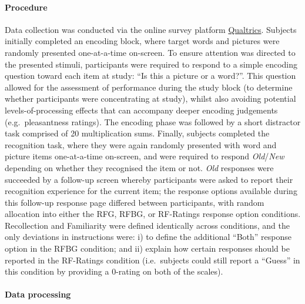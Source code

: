 \documentclass[
  11pt,
]{article}
\begin{document}
\hypertarget{procedure}{%
\paragraph{Procedure}\label{procedure}}

Data collection was conducted via the online survey platform
\href{https://www.qualtrics.com/uk/}{Qualtrics}. Subjects initially
completed an encoding block, where target words and pictures were
randomly presented one-at-a-time on-screen. To ensure attention was
directed to the presented stimuli, participants were required to respond
to a simple encoding question toward each item at study: ``Is this a
picture or a word?''. This question allowed for the assessment of
performance during the study block (to determine whether participants
were concentrating at study), whilst also avoiding potential
levels-of-processing effects that can accompany deeper encoding
judgements (e.g.~pleasantness ratings). The encoding phase was followed
by a short distractor task comprised of 20 multiplication sums. Finally,
subjects completed the recognition task, where they were again randomly
presented with word and picture items one-at-a-time on-screen, and were
required to respond \emph{Old}/\emph{New} depending on whether they
recognised the item or not. \emph{Old} responses were succeeded by a
follow-up screen whereby participants were asked to report their
recognition experience for the current item; the response options
available during this follow-up response page differed between
participants, with random allocation into either the RFG, RFBG, or
RF-Ratings response option conditions. Recollection and Familiarity were
defined identically across conditions, and the only deviations in
instructions were: i) to define the additional ``Both'' response option
in the RFBG condition; and ii) explain how certain responses should be
reported in the RF-Ratings condition (i.e.~subjects could still report a
``Guess'' in this condition by providing a 0-rating on both of the
scales).

\hypertarget{data-processing}{%
\paragraph{Data processing}\label{data-processing}}
\end{document}
